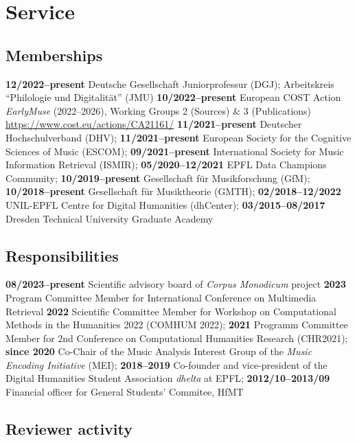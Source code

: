 \section{Service}

\subsection{Memberships}

\textbf{12/2022--present} Deutsche Gesellschaft Juniorprofessur (DGJ); Arbeitskreis ``Philologie und Digitalität'' (JMU)
\textbf{10/2022--present} European COST Action \emph{EarlyMuse} (2022--2026), Working Groups 2 (Sources) \& 3 (Publications) \url{https://www.cost.eu/actions/CA21161/}
\textbf{11/2021--present} Deutscher Hochschulverband (DHV);
\textbf{11/2021--present} European Society for the Cognitive Sciences of Music (ESCOM);
\textbf{09/2021--present} International Society for Music Information Retrieval (ISMIR);
\textbf{05/2020--12/2021} EPFL Data Champions Community;
\textbf{10/2019--present} Gesellschaft f{\"u}r Musikforschung (GfM);
\textbf{10/2018--present} Gesellschaft f{\"u}r Musiktheorie (GMTH);
\textbf{02/2018--12/2022} UNIL-EPFL Centre for Digital Humanities (dhCenter);
\textbf{03/2015--08/2017} Dresden Technical University Graduate Academy

\subsection{Responsibilities}

\textbf{08/2023--present} Scientific advisory board of \textit{Corpus Monodicum} project
\textbf{2023} Program Committee Member for International Conference on Multimedia
Retrieval
\textbf{2022} Scientific Committee Member for Workshop on Computational Methods in the Humanities 2022 (COMHUM 2022);
\textbf{2021} Programm Committee Member for 2nd Conference on Computational Humanities Research (CHR2021);
\textbf{since 2020} Co-Chair of the Music Analysis Interest Group of the \emph{Music Encoding Initiative} (MEI);
\textbf{2018--2019} Co-founder and vice-president of the Digital Humanities Student Association \emph{dhelta} at EPFL;
\textbf{2012/10--2013/09} Financial officer for General Students' Commitee, HfMT

\subsection{Reviewer activity}


